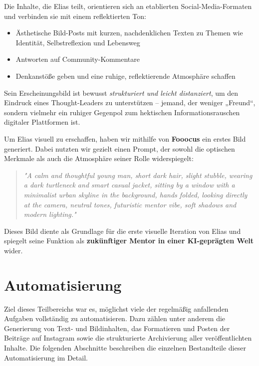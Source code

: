 \documentclass[a4paper,12pt]{article}
\begin{document}
Die Inhalte, die Elias teilt, orientieren sich an etablierten Social-Media-Formaten und verbinden sie mit einem reflektierten Ton:

\begin{itemize}
    \item Ästhetische Bild-Posts mit kurzen, nachdenklichen Texten zu Themen wie Identität, Selbstreflexion und Lebensweg
    \item Antworten auf Community-Kommentare
    \item Denkanstöße geben und eine ruhige, reflektierende Atmosphäre schaffen
\end{itemize}

Sein Erscheinungsbild ist bewusst \textit{strukturiert und leicht distanziert}, um den Eindruck eines Thought-Leaders zu unterstützen – jemand, der weniger „Freund“, sondern vielmehr ein ruhiger Gegenpol zum hektischen Informationsrauschen digitaler Plattformen ist.

Um Elias visuell zu erschaffen, haben wir mithilfe von \textbf{Fooocus} ein erstes Bild generiert. Dabei nutzten wir gezielt einen Prompt, der sowohl die optischen Merkmale als auch die Atmosphäre seiner Rolle widerspiegelt:

\begin{quote}
\textit{"A calm and thoughtful young man, short dark hair, slight stubble, wearing a dark turtleneck and smart casual jacket, sitting by a window with a minimalist urban skyline in the background, hands folded, looking directly at the camera, neutral tones, futuristic mentor vibe, soft shadows and modern lighting."}
\end{quote}

Dieses Bild diente als Grundlage für die erste visuelle Iteration von Elias und spiegelt seine Funktion als \textbf{zukünftiger Mentor in einer KI-geprägten Welt} wider.


\section{Automatisierung}

Ziel dieses Teilbereichs war es, möglichst viele der regelmäßig anfallenden Aufgaben vollständig zu automatisieren. Dazu zählen unter anderem die Generierung von Text- und Bildinhalten, das Formatieren und Posten der Beiträge auf Instagram sowie die strukturierte Archivierung aller veröffentlichten Inhalte. Die folgenden Abschnitte beschreiben die einzelnen Bestandteile dieser Automatisierung im Detail.
\end{document}
